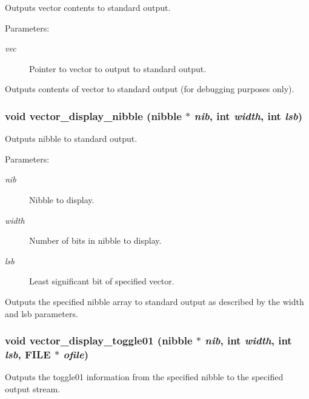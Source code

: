 Outputs vector contents to standard output. 

\begin{Desc}
\item[Parameters:]
\begin{description}
\item[{\em vec}]Pointer to vector to output to standard output.\end{description}
\end{Desc}
Outputs contents of vector to standard output (for debugging purposes only). 
\subsubsection{\setlength{\rightskip}{0pt plus 5cm}void vector\_\-display\_\-nibble ({\bf nibble} $\ast$ {\em nib}, int {\em width}, int {\em lsb})}\label{vector_8c_a16}


Outputs nibble to standard output. 

\begin{Desc}
\item[Parameters:]
\begin{description}
\item[{\em nib}]Nibble to display. \item[{\em width}]Number of bits in nibble to display. \item[{\em lsb}]Least significant bit of specified vector.\end{description}
\end{Desc}
Outputs the specified nibble array to standard output as described by the width and lsb parameters. 
\subsubsection{\setlength{\rightskip}{0pt plus 5cm}void vector\_\-display\_\-toggle01 ({\bf nibble} $\ast$ {\em nib}, int {\em width}, int {\em lsb}, FILE $\ast$ {\em ofile})}\label{vector_8c_a14}


Outputs the toggle01 information from the specified nibble to the specified output stream. 

